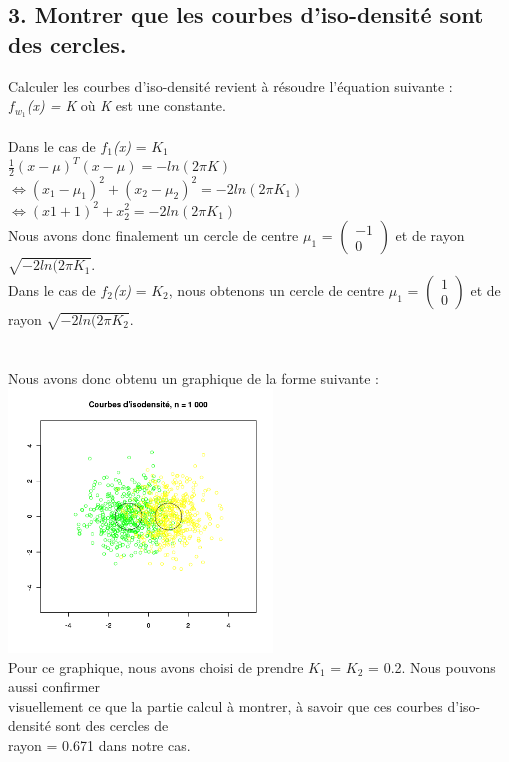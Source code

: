 \documentclass[a4paper, 10pt]{article}
\begin{document}
\subsection*{3. Montrer que les courbes d'iso-densité sont des cercles.}
Calculer les courbes d'iso-densité revient à résoudre l'équation suivante :\\
\textit{$f_{w_{1}}$(x) = K} où \textit{K} est une constante.\\ \\
Dans le cas de \textit{$f_{1}$(x)} = $K_{1}$\\
$\frac{1}{2}(x - \mu)^{T} (x -\mu) = -ln(2\pi K)$\\
$\Leftrightarrow (x_{1} - \mu_{1})^{2} + (x_{2} - \mu_{2})^{2} = -2ln(2\pi K_{1})$\\
$\Leftrightarrow (x{1} + 1)^{2} + x_{2}^{2} = -2ln(2\pi K_{1})$\\
Nous avons donc finalement un cercle de centre $\mu_{1}$ = $\begin{pmatrix} -1 \\ 0 \end{pmatrix}$ et de rayon $\sqrt{-2ln(2\pi K_{1}}$.\\
Dans le cas de \textit{$f_{2}$(x)} = $K_{2}$,
nous obtenons un cercle de centre $\mu_{1}$ = $\begin{pmatrix} 1 \\ 0 \end{pmatrix}$ et de rayon $\sqrt{-2ln(2\pi K_{2}}$.\\ \\ \\
Nous avons donc obtenu un graphique de la forme suivante :\\
\includegraphics[height = 7cm, width = 7cm]{plots/plot_isodensite.png}\\
Pour ce graphique, nous avons choisi de prendre \textit{$K_{1}$} = \textit{$K_{2}$} = 0.2.
Nous pouvons aussi confirmer\\visuellement ce que la partie calcul à montrer,
à savoir que ces courbes d'iso-densité sont des cercles de\\rayon = 0.671 dans notre cas.
\newpage
\end{document}

